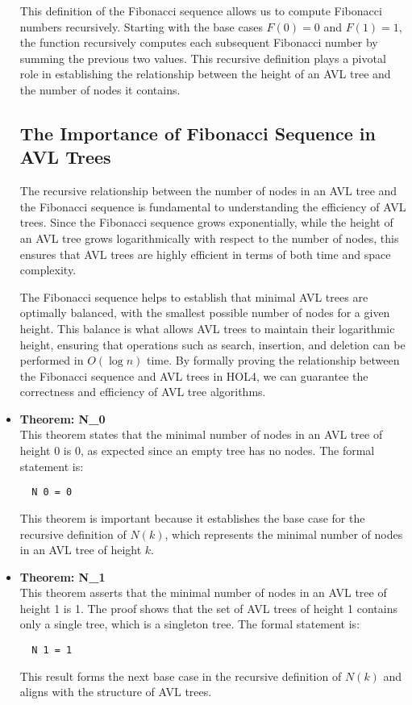 \documentclass[12pt]{article}
\begin{document}
\begin{itemize}
This definition of the Fibonacci sequence allows us to compute Fibonacci numbers recursively. Starting with the base cases \( F(0) = 0 \) and \( F(1) = 1 \), the function recursively computes each subsequent Fibonacci number by summing the previous two values. This recursive definition plays a pivotal role in establishing the relationship between the height of an AVL tree and the number of nodes it contains.


\subsection{The Importance of Fibonacci Sequence in AVL Trees}

The recursive relationship between the number of nodes in an AVL tree and the Fibonacci sequence is fundamental to understanding the efficiency of AVL trees. Since the Fibonacci sequence grows exponentially, while the height of an AVL tree grows logarithmically with respect to the number of nodes, this ensures that AVL trees are highly efficient in terms of both time and space complexity.

The Fibonacci sequence helps to establish that minimal AVL trees are optimally balanced, with the smallest possible number of nodes for a given height. This balance is what allows AVL trees to maintain their logarithmic height, ensuring that operations such as search, insertion, and deletion can be performed in \( O(\log n) \) time. By formally proving the relationship between the Fibonacci sequence and AVL trees in HOL4, we can guarantee the correctness and efficiency of AVL tree algorithms.
\item \textbf{Theorem: N\_0} \\
  This theorem states that the minimal number of nodes in an AVL tree of height 0 is 0, as expected since an empty tree has no nodes. The formal statement is:
  \begin{verbatim}
  N 0 = 0
  \end{verbatim}
  This theorem is important because it establishes the base case for the recursive definition of \( N(k) \), which represents the minimal number of nodes in an AVL tree of height \( k \).

\item \textbf{Theorem: N\_1} \\
  This theorem asserts that the minimal number of nodes in an AVL tree of height 1 is 1. The proof shows that the set of AVL trees of height 1 contains only a single tree, which is a singleton tree. The formal statement is:
  \begin{verbatim}
  N 1 = 1
  \end{verbatim}
  This result forms the next base case in the recursive definition of \( N(k) \) and aligns with the structure of AVL trees.


\end{itemize}
\end{document}
